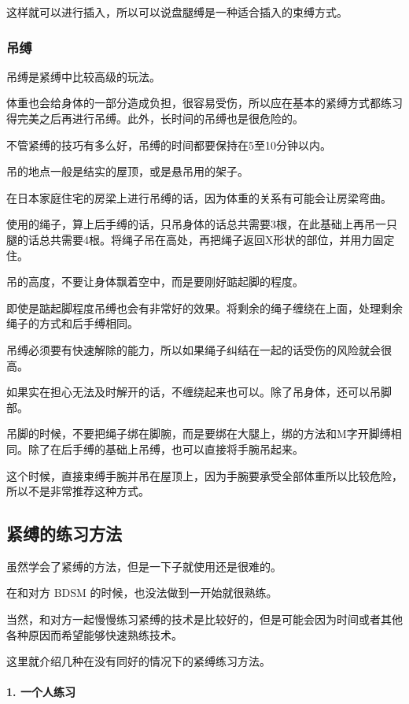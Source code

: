 \documentclass[12pt,UTF8]{ctexbook}
\begin{document}
这样就可以进行插入，所以可以说盘腿缚是一种适合插入的束缚方式。

\subsubsection{吊缚}

吊缚是紧缚中比较高级的玩法。

体重也会给身体的一部分造成负担，很容易受伤，所以应在基本的紧缚方式都练习得完美之后再进行吊缚。此外，长时间的吊缚也是很危险的。

不管紧缚的技巧有多么好，吊缚的时间都要保持在5至10分钟以内。

吊的地点一般是结实的屋顶，或是悬吊用的架子。

在日本家庭住宅的房梁上进行吊缚的话，因为体重的关系有可能会让房梁弯曲。

使用的绳子，算上后手缚的话，只吊身体的话总共需要3根，在此基础上再吊一只腿的话总共需要4根。将绳子吊在高处，再把绳子返回X形状的部位，并用力固定住。

吊的高度，不要让身体飘着空中，而是要刚好踮起脚的程度。

即使是踮起脚程度吊缚也会有非常好的效果。将剩余的绳子缠绕在上面，处理剩余绳子的方式和后手缚相同。

吊缚必须要有快速解除的能力，所以如果绳子纠结在一起的话受伤的风险就会很高。

如果实在担心无法及时解开的话，不缠绕起来也可以。除了吊身体，还可以吊脚部。

吊脚的时候，不要把绳子绑在脚腕，而是要绑在大腿上，绑的方法和M字开脚缚相同。除了在后手缚的基础上吊缚，也可以直接将手腕吊起来。

这个时候，直接束缚手腕并吊在屋顶上，因为手腕要承受全部体重所以比较危险，所以不是非常推荐这种方式。

\subsection{紧缚的练习方法}

虽然学会了紧缚的方法，但是一下子就使用还是很难的。

在和对方 BDSM 的时候，也没法做到一开始就很熟练。

当然，和对方一起慢慢练习紧缚的技术是比较好的，但是可能会因为时间或者其他各种原因而希望能够快速熟练技术。

这里就介绍几种在没有同好的情况下的紧缚练习方法。

\paragraph{1. 一个人练习}
\end{document}
